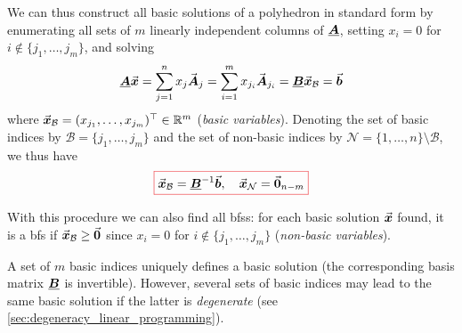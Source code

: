 We can thus construct all basic solutions of a polyhedron in standard form by 
enumerating all sets of \(m\) linearly independent columns of \(\underline{\boldsymbol{A}}\), 
setting \(x_i = 0\) for \(i \notin \{j_1, \ldots, j_m\}\),
and solving
\begin{equation}\label{eq:basic_solution_standard_form_implicit}
\underline{\boldsymbol{A}} \vec{\boldsymbol{x}} 
= \sum_{j=1}^{n} x_j \vec{\boldsymbol{A}}_j
= \sum_{i=1}^{m} x_{j_i} \vec{\boldsymbol{A}}_{j_i}
= \underline{\boldsymbol{B}} \vec{\boldsymbol{x}}_\mathcal{B}
= \vec{\boldsymbol{b}} 
\end{equation}
where \(\vec{\boldsymbol{x}}_\mathcal{B} = (x_{j_1}, \ldots, x_{j_m})^\top \in \mathbb{R}^m\) (\emph{basic variables}). %
Denoting the set of basic indices by \(\mathcal{B} = \{j_1, \ldots, j_m\}\) and the set of non-basic indices by \(\mathcal{N} = \{1, \ldots, n\} \setminus \mathcal{B}\), we thus have
\begin{equation}\label{eq:basic_solution_standard_form}
{\color{Red}
\boxed{
\color{black}
\vect{x}_\mathcal{B} = \matr{B}^{-1} \vect{b}, \quad \vect{x}_\mathcal{N} = \vect{0}_{n-m}
}
}
\end{equation}


With this procedure we can also find all \gls{bfs}s: 
for each basic solution \(\vec{\boldsymbol{x}}\) found, it is a \gls{bfs} if \(\vec{\boldsymbol{x}}_\mathcal{B} \geq \vec{\boldsymbol{0}}\) since \(x_i = 0\) for \(i \notin \{j_1, \ldots, j_m\}\) (\emph{non-basic variables}). 

A set of \(m\) basic indices uniquely defines a basic solution (the corresponding basis matrix \(\underline{\boldsymbol{B}}\) is invertible).
However, several sets of basic indices may lead to the same basic solution if the latter is \emph{degenerate} (see \ref{sec:degeneracy_linear_programming}).


